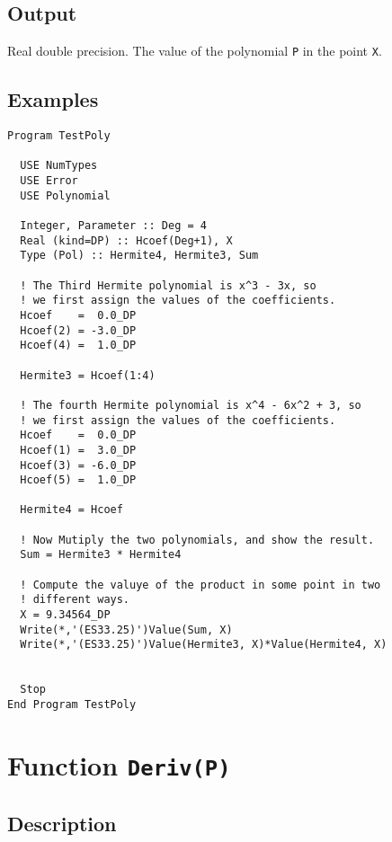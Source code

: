 \subsection{Output}

Real double precision. The value of the polynomial \texttt{P} in the
point \texttt{X}. 

\subsection{Examples}

\begin{lstlisting}[emph=Value,
                   emphstyle=\color{blue},
                   frame=trBL,
                   caption=Computes the values of a polynomial at some
                   points.,
                   label=valuepol]
Program TestPoly

  USE NumTypes
  USE Error
  USE Polynomial

  Integer, Parameter :: Deg = 4
  Real (kind=DP) :: Hcoef(Deg+1), X
  Type (Pol) :: Hermite4, Hermite3, Sum

  ! The Third Hermite polynomial is x^3 - 3x, so
  ! we first assign the values of the coefficients.
  Hcoef    =  0.0_DP
  Hcoef(2) = -3.0_DP
  Hcoef(4) =  1.0_DP

  Hermite3 = Hcoef(1:4)

  ! The fourth Hermite polynomial is x^4 - 6x^2 + 3, so
  ! we first assign the values of the coefficients.
  Hcoef    =  0.0_DP
  Hcoef(1) =  3.0_DP
  Hcoef(3) = -6.0_DP
  Hcoef(5) =  1.0_DP

  Hermite4 = Hcoef

  ! Now Mutiply the two polynomials, and show the result.
  Sum = Hermite3 * Hermite4
  
  ! Compute the valuye of the product in some point in two 
  ! different ways.
  X = 9.34564_DP
  Write(*,'(ES33.25)')Value(Sum, X)
  Write(*,'(ES33.25)')Value(Hermite3, X)*Value(Hermite4, X)


  Stop
End Program TestPoly
\end{lstlisting}


\section{Function \texttt{Deriv(P)}}

\subsection{Description}

